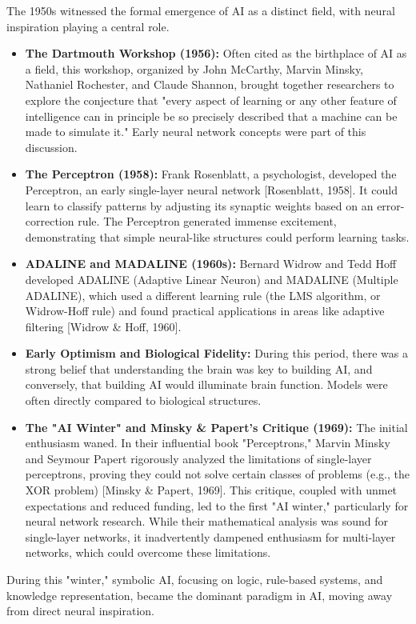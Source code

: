 \documentclass[11pt,a4paper]{article}
\begin{document}
The 1950s witnessed the formal emergence of AI as a distinct field, with neural inspiration playing a central role.
\begin{itemize}
    \item \textbf{The Dartmouth Workshop (1956):} Often cited as the birthplace of AI as a field, this workshop, organized by John McCarthy, Marvin Minsky, Nathaniel Rochester, and Claude Shannon, brought together researchers to explore the conjecture that "every aspect of learning or any other feature of intelligence can in principle be so precisely described that a machine can be made to simulate it." Early neural network concepts were part of this discussion.
    \item \textbf{The Perceptron (1958):} Frank Rosenblatt, a psychologist, developed the Perceptron, an early single-layer neural network [Rosenblatt, 1958]. It could learn to classify patterns by adjusting its synaptic weights based on an error-correction rule. The Perceptron generated immense excitement, demonstrating that simple neural-like structures could perform learning tasks.
    \item \textbf{ADALINE and MADALINE (1960s):} Bernard Widrow and Tedd Hoff developed ADALINE (Adaptive Linear Neuron) and MADALINE (Multiple ADALINE), which used a different learning rule (the LMS algorithm, or Widrow-Hoff rule) and found practical applications in areas like adaptive filtering [Widrow \& Hoff, 1960].
    \item \textbf{Early Optimism and Biological Fidelity:} During this period, there was a strong belief that understanding the brain was key to building AI, and conversely, that building AI would illuminate brain function. Models were often directly compared to biological structures.
    \item \textbf{The "AI Winter" and Minsky \& Papert's Critique (1969):} The initial enthusiasm waned. In their influential book "Perceptrons," Marvin Minsky and Seymour Papert rigorously analyzed the limitations of single-layer perceptrons, proving they could not solve certain classes of problems (e.g., the XOR problem) [Minsky \& Papert, 1969]. This critique, coupled with unmet expectations and reduced funding, led to the first "AI winter," particularly for neural network research. While their mathematical analysis was sound for single-layer networks, it inadvertently dampened enthusiasm for multi-layer networks, which could overcome these limitations.
\end{itemize}
During this "winter," symbolic AI, focusing on logic, rule-based systems, and knowledge representation, became the dominant paradigm in AI, moving away from direct neural inspiration.
\end{document}
